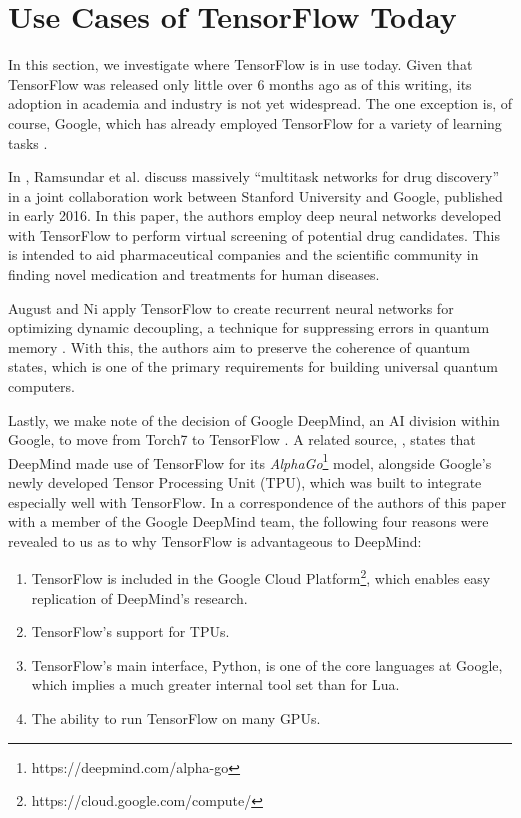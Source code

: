 \section{Use Cases of TensorFlow Today}\label{sec:uses}

In this section, we investigate where TensorFlow is in use today. Given that
TensorFlow was released only little over 6 months ago as of this writing, its
adoption in academia and industry is not yet widespread. The one exception is,
of course, Google, which has already employed TensorFlow for a variety of
learning tasks \cite{phones, emails, drugs, inception}.

In \cite{drugs}, Ramsundar et al. discuss massively ``multitask networks for
drug discovery'' in a joint collaboration work between Stanford University and
Google, published in early 2016. In this paper, the authors employ deep neural
networks developed with TensorFlow to perform virtual screening of potential
drug candidates. This is intended to aid pharmaceutical companies and the
scientific community in finding novel medication and treatments for human
diseases.

August and Ni apply TensorFlow to create recurrent neural networks for
optimizing dynamic decoupling, a technique for suppressing errors in quantum
memory \cite{august}. With this, the authors aim to preserve the coherence of
quantum states, which is one of the primary requirements for building universal
quantum computers.

Lastly, we make note of the decision of Google DeepMind, an AI division within
Google, to move from Torch7 to TensorFlow \cite{deepmind}. A related source,
\cite{tpu}, states that DeepMind made use of TensorFlow for its
\emph{AlphaGo}\footnote{https://deepmind.com/alpha-go} model, alongside Google's
newly developed Tensor Processing Unit (TPU), which was built to integrate
especially well with TensorFlow. In a correspondence of the authors of this
paper with a member of the Google DeepMind team, the following four reasons were
revealed to us as to why TensorFlow is advantageous to DeepMind:

\begin{enumerate}
\item TensorFlow is included in the Google Cloud
  Platform\footnote{https://cloud.google.com/compute/}, which enables easy
  replication of DeepMind's research.
\item TensorFlow's support for TPUs.
\item TensorFlow's main interface, Python, is one of the core languages at
  Google, which implies a much greater internal tool set than for Lua.
\item The ability to run TensorFlow on many GPUs.
\end{enumerate}

